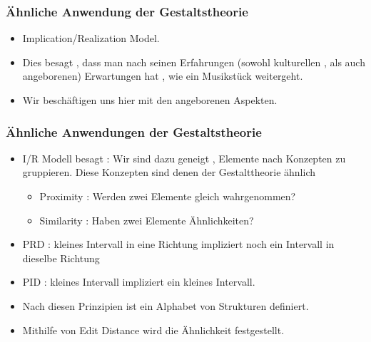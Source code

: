 \documentclass{beamer}
\begin{document}
	\begin{frame}
		\frametitle{Ähnliche Anwendung der Gestaltstheorie}
		\begin{minipage}{0.45\textwidth}
			\begin{figure}[h!]
				\footnotemark
			\end{figure}
		\end{minipage}%
		\begin{minipage}{0.45\textwidth}
			\begin{itemize}
				\item Implication/Realization Model.
				\item Dies besagt , dass man nach seinen Erfahrungen (sowohl kulturellen , als auch angeborenen) Erwartungen hat , wie ein Musikstück weitergeht. 
				\item Wir beschäftigen uns hier mit den angeborenen Aspekten.
			\end{itemize}
		\end{minipage}
	\end{frame}
	\begin{frame}
		\frametitle{Ähnliche Anwendungen der Gestaltstheorie}
		\begin{itemize}
			\item I/R Modell besagt : Wir sind dazu geneigt , Elemente nach Konzepten zu gruppieren. Diese Konzepten sind denen der Gestalttheorie ähnlich
					\begin{itemize}
						\item Proximity : Werden zwei Elemente gleich wahrgenommen?
						\item Similarity : Haben zwei Elemente Ähnlichkeiten?
					\end{itemize}
			\item PRD : kleines Intervall in eine Richtung impliziert noch ein Intervall in dieselbe Richtung
			\item PID : kleines Intervall impliziert ein kleines Intervall.
			\item Nach diesen Prinzipien ist ein Alphabet von Strukturen definiert.
			\item Mithilfe von Edit Distance wird die Ähnlichkeit festgestellt.
		\end{itemize}
	\end{frame}
\end{document}
